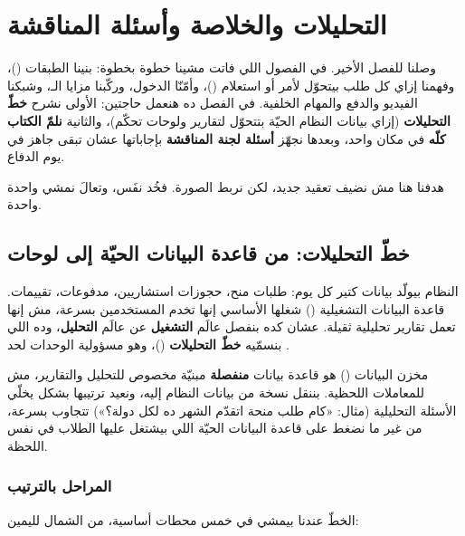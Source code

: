 \section{التحليلات والخلاصة وأسئلة المناقشة}

وصلنا للفصل الأخير. في الفصول اللي فاتت مشينا خطوة بخطوة: بنينا الطبقات
()، وفهمنا إزاي كل طلب بيتحوّل لأمر أو استعلام
()، وأمّنّا الدخول، وركّبنا مزايا الـ، وشبكنا الفيديو والدفع
والمهام الخلفية. في الفصل ده هنعمل حاجتين: الأولى نشرح \textbf{خطّ التحليلات}
(إزاي بيانات النظام الحيّة بتتحوّل لتقارير ولوحات تحكّم)، والثانية \textbf{نلمّ
الكتاب كلّه} في مكان واحد، وبعدها نجهّز \textbf{أسئلة لجنة المناقشة} بإجاباتها
عشان تبقى جاهز في يوم الدفاع.

هدفنا هنا مش نضيف تعقيد جديد، لكن نربط الصورة. فخُد نفَس، وتعالَ نمشي واحدة واحدة.

\subsection{خطّ التحليلات: من قاعدة البيانات الحيّة إلى لوحات }

النظام بيولّد بيانات كتير كل يوم: طلبات منح، حجوزات استشاريين، مدفوعات، تقييمات.
قاعدة البيانات التشغيلية () شغلها الأساسي إنها تخدم المستخدمين بسرعة،
مش إنها تعمل تقارير تحليلية ثقيلة. عشان كده بنفصل عالَم \textbf{التشغيل} عن عالَم
\textbf{التحليل}، وده اللي بنسمّيه \textbf{خطّ التحليلات} ()، وهو مسؤولية الوحدات  لحد .

\begin{idea}
مخزن البيانات () هو قاعدة بيانات \textbf{منفصلة} مبنيّة مخصوص
للتحليل والتقارير، مش للمعاملات اللحظية. بننقل نسخة من بيانات النظام إليه، ونعيد
ترتيبها بشكل يخلّي الأسئلة التحليلية (مثال: «كام طلب منحة اتقدّم الشهر ده لكل
دولة؟») تتجاوب بسرعة، من غير ما نضغط على قاعدة البيانات الحيّة اللي بيشتغل عليها
الطلاب في نفس اللحظة.
\end{idea}

\subsubsection{المراحل بالترتيب}

الخطّ عندنا بيمشي في خمس محطات أساسية، من الشمال لليمين:

